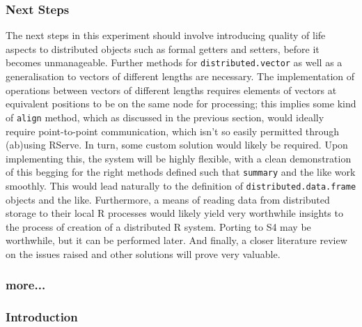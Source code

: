 \hypertarget{next-steps}{%
\subsubsection{Next Steps}\label{next-steps}}

The next steps in this experiment should involve introducing quality of
life aspects to distributed objects such as formal getters and setters,
before it becomes unmanageable. Further methods for
\texttt{distributed.vector} as well as a generalisation to vectors of
different lengths are necessary. The implementation of operations
between vectors of different lengths requires elements of vectors at
equivalent positions to be on the same node for processing; this implies
some kind of \texttt{align} method, which as discussed in the previous
section, would ideally require point-to-point communication, which isn't
so easily permitted through (ab)using RServe. In turn, some custom
solution would likely be required. Upon implementing this, the system
will be highly flexible, with a clean demonstration of this begging for
the right methods defined such that \texttt{summary} and the like work
smoothly. This would lead naturally to the definition of
\texttt{distributed.data.frame} objects and the like. Furthermore, a
means of reading data from distributed storage to their local R
processes would likely yield very worthwhile insights to the process of
creation of a distributed R system. Porting to S4 may be worthwhile, but
it can be performed later. And finally, a closer literature review on
the issues raised and other solutions will prove very valuable.

\subsubsection{more...}

\hypertarget{introduction}{%
\subsubsection{Introduction}\label{introduction}}

